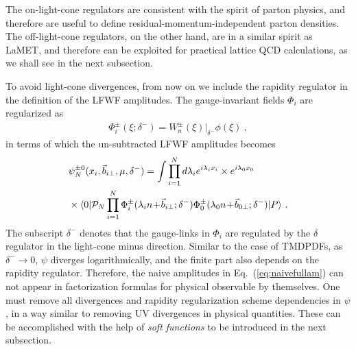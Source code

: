 \documentclass[twocolumn,superscriptaddress,longbibliography,10pt]{revtex4-1}
\begin{document}
The on-light-cone regulators are consistent with the spirit of parton physics, and therefore are useful to define residual-momentum-independent parton densities. The off-light-cone regulators, on the other hand, are in a similar spirit as LaMET, and therefore can be exploited for practical lattice QCD calculations, as we shall see in the next subsection.

To avoid light-cone divergences, from now on we include the rapidity regulator in the definition of the LFWF amplitudes.  The gauge-invariant fields $\Phi_i$ are regularized  as
\begin{align}
\Phi^{\pm}_{i}(\xi;\delta^-)= W^{\pm}_{n}(\xi)|_{\delta^-}\phi(\xi) \ ,
\end{align}
in terms of which the un-subtracted LFWF amplitudes becomes
\begin{align}\label{eq:naivefullam}
&\psi^{\pm0}_{N}(x_i,\vec{b}_{i\perp},\mu,\delta^-)=\int \prod^N_{i=1} d\lambda_i e^{i\lambda_i x_{i}} \times e^{i\lambda_0x_0}\\ &\times\langle 0 | {\cal P}_N\prod^N_{i=1}\Phi^{\pm}_{i}(\lambda_{i}n\!+\!\vec{b}_{i\perp};\delta^-)\Phi^{\pm}_0(\lambda_{0}n\!+\!{\vec b}_{0\perp};\delta^-) |P\rangle \ . \nonumber
\end{align}
The subscript $\delta^-$ denotes that the gauge-links in $\Phi_i$ are regulated by the $\delta$ regulator in the light-cone minus direction.  Similar to the case of TMDPDFs, as $\delta^- \rightarrow 0$, $\psi$ diverges logarithmically, and the finite part also depends on the rapidity regulator. Therefore, the naive amplitudes in Eq.~(\ref{eq:naivefullam}) can not appear in factorization formulas for physical observable by themselves. One must remove all divergences and rapidity regularization scheme dependencies in $\psi$, in a way similar to removing UV divergences in physical quantities. These can be accomplished with the help of {\it soft functions} to be introduced in the next subsection.
\end{document}
